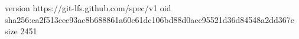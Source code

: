 version https://git-lfs.github.com/spec/v1
oid sha256:ea2f513cee93ac8b688861a60c61dc106bd88d0acc95521d36d84548a2dd367e
size 2451
